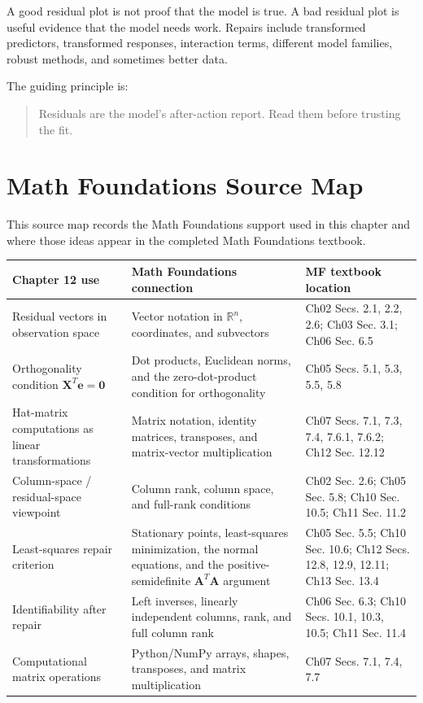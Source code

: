 {A good residual plot is not proof that the model is true.  A bad residual plot is useful evidence that the model needs work.  Repairs include transformed predictors, transformed responses, interaction terms, different model families, robust methods, and sometimes better data.

The guiding principle is:
\begin{quote}
  Residuals are the model's after-action report.  Read them before trusting the fit.
\end{quote}

\section{Math Foundations Source Map}

This source map records the Math Foundations support used in this chapter and where those ideas appear in the completed Math Foundations textbook.

\begin{center}
\begin{tabular}{|p{}|p{}|p{}|}
\hline
\textbf{Chapter 12 use} & \textbf{Math Foundations connection} & \textbf{MF textbook location} \\
\hline
Residual vectors in observation space & Vector notation in \(\mathbb{R}^n\), coordinates, and subvectors & Ch02 Secs. 2.1, 2.2, 2.6; Ch03 Sec. 3.1; Ch06 Sec. 6.5 \\
\hline
Orthogonality condition \(\mathbf{X}^T\mathbf{e}=\mathbf{0}\) & Dot products, Euclidean norms, and the zero-dot-product condition for orthogonality & Ch05 Secs. 5.1, 5.3, 5.5, 5.8 \\
\hline
Hat-matrix computations as linear transformations & Matrix notation, identity matrices, transposes, and matrix-vector multiplication & Ch07 Secs. 7.1, 7.3, 7.4, 7.6.1, 7.6.2; Ch12 Sec. 12.12 \\
\hline
Column-space / residual-space viewpoint & Column rank, column space, and full-rank conditions & Ch02 Sec. 2.6; Ch05 Sec. 5.8; Ch10 Sec. 10.5; Ch11 Sec. 11.2 \\
\hline
Least-squares repair criterion & Stationary points, least-squares minimization, the normal equations, and the positive-semidefinite \(\mathbf{A}^T\mathbf{A}\) argument & Ch05 Sec. 5.5; Ch10 Sec. 10.6; Ch12 Secs. 12.8, 12.9, 12.11; Ch13 Sec. 13.4 \\
\hline
Identifiability after repair & Left inverses, linearly independent columns, rank, and full column rank & Ch06 Sec. 6.3; Ch10 Secs. 10.1, 10.3, 10.5; Ch11 Sec. 11.4 \\
\hline
Computational matrix operations & Python/NumPy arrays, shapes, transposes, and matrix multiplication & Ch07 Secs. 7.1, 7.4, 7.7 \\
\hline
\end{tabular}
\end{center}

}
